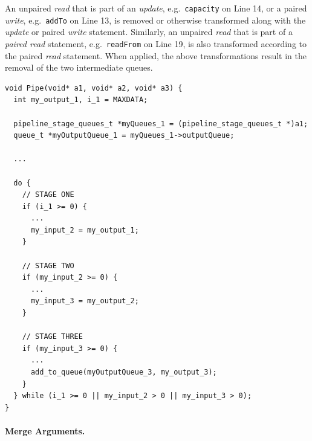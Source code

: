 %
An unpaired \emph{read} that is part of an \emph{update}, e.g.\ \lstinline|capacity| on Line 14, or a paired \emph{write}, e.g.\ \lstinline|addTo| on Line 13, is removed or otherwise transformed along with the \emph{update} or paired \emph{write} statement. Similarly, an unpaired \emph{read} that is part of a \emph{paired read} statement, e.g.\ \lstinline|readFrom| on Line 19, is also transformed according to the paired \emph{read} statement.
%
%
When applied, the above transformations result in the removal of the two intermediate queues.
%
\begin{lstlisting}
void Pipe(void* a1, void* a2, void* a3) {
  int my_output_1, i_1 = MAXDATA;
  
  pipeline_stage_queues_t *myQueues_1 = (pipeline_stage_queues_t *)a1;
  queue_t *myOutputQueue_1 = myQueues_1->outputQueue;

  ...

  do {
    // STAGE ONE
    if (i_1 >= 0) { 
      ...
      my_input_2 = my_output_1;
    }

    // STAGE TWO
    if (my_input_2 >= 0) {
      ...
      my_input_3 = my_output_2;
    }
    
    // STAGE THREE
    if (my_input_3 >= 0) {
      ...
      add_to_queue(myOutputQueue_3, my_output_3);
    }
  } while (i_1 >= 0 || my_input_2 > 0 || my_input_3 > 0);
}
\end{lstlisting}



\paragraph{Merge Arguments.}

